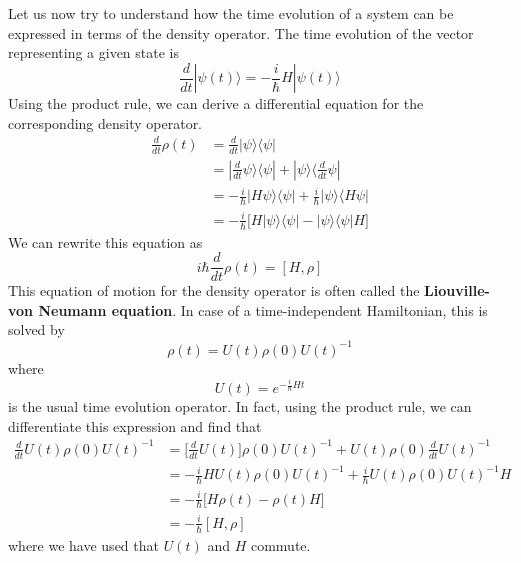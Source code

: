 \documentclass[a4paper, draft]{article}
\theoremstyle{own}
\theoremstyle{remark}
\begin{document}
Let us now try to understand how the time evolution of a system can be expressed in terms of the density operator. The time evolution of the vector representing a given state is 
$$
\frac{d}{dt} |\psi(t) \rangle = - \frac{i}{\hbar} H |\psi(t) \rangle
$$ 
Using the product rule, we can derive a differential equation for the corresponding density operator.
\begin{align*}
\frac{d}{dt} \rho(t) &= \frac{d}{dt} |\psi \rangle \langle \psi |  \\
&= | \frac{d}{dt} \psi \rangle \langle \psi | + |\psi \rangle \langle \frac{d}{dt} \psi | \\
&= - \frac{i}{\hbar} | H \psi \rangle \langle \psi | + \frac{i}{\hbar} |\psi \rangle \langle H \psi |\\
&= - \frac{i}{\hbar} \big[  H | \psi \rangle \langle \psi | -  |\psi \rangle \langle \psi | H \big] 
\end{align*}
We can rewrite this equation as
$$
i \hbar \frac{d}{dt} \rho(t)=  [H, \rho]
$$
This equation of motion for the density operator is often called the {\bf Liouville-von Neumann equation}. In case of a time-independent Hamiltonian, this is solved by
$$
\rho(t) = U(t) \rho(0) U(t)^{-1}
$$
where 
$$
U(t) = e^{-\frac{i}{\hbar} H t}
$$
is the usual time evolution operator. In fact, using the product rule, we can differentiate this expression and find that
\begin{align*}
\frac{d}{dt} U(t) \rho(0) U(t)^{-1} &= \big[ \frac{d}{dt} U(t) \big] \rho(0) U(t)^{-1} +
U(t) \rho(0) \frac{d}{dt} U(t)^{-1} \\
&= -\frac{i}{\hbar} H U(t) \rho(0) U(t)^{-1} + \frac{i}{\hbar} U(t) \rho(0)  U(t)^{-1} H \\&= -\frac{i}{\hbar} \big[ H \rho(t) - \rho(t) H \big] \\
&= -\frac{i}{\hbar} [H, \rho]
\end{align*}
where we have used that $U(t)$ and $H$ commute.
\end{document}
